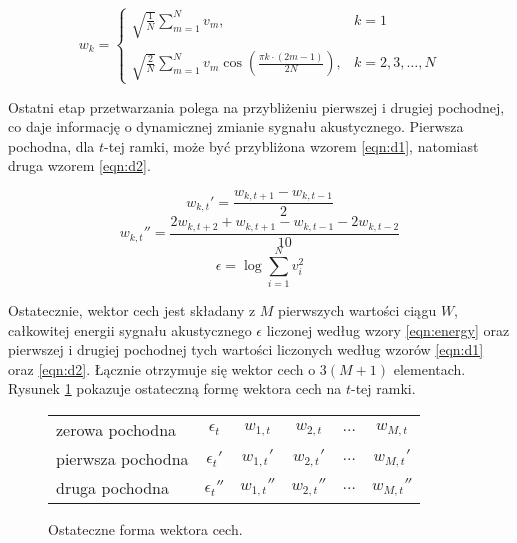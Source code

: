 \documentclass[11pt]{article}
\begin{document}
	 \begin{equation}
		w_k = 
		\begin{cases}
			\sqrt{\frac{1}{N}}\sum_{m=1}^{N}v_m, & k = 1 \\
			&\\
			\sqrt{\frac{2}{N}}\sum_{m=1}^{N}{v_m \cos(\frac{\pi k \cdot (2m - 1)}{2N})}, & k = 2,3,\ldots,N
		\end{cases}
		\label{eqn:DCT}
	 \end{equation}
	 
	 Ostatni etap przetwarzania polega na przybliżeniu pierwszej i drugiej pochodnej, co daje informację o dynamicznej zmianie sygnału akustycznego. Pierwsza pochodna, dla $t$-tej ramki, może być przybliżona wzorem \ref{eqn:d1}, natomiast druga wzorem \ref{eqn:d2}.
	 
	 \begin{equation}
	 	 w_{k,t}'=\frac{w_{k,t+1}-w_{k,t-1}}{2}
	 	 \label{eqn:d1}
	 \end{equation}
	 \begin{equation}
		 w_{k,t}''=\frac{2w_{k,t+2}+w_{k,t+1}-w_{k,t-1}-2w_{k,t-2}}{10}
		 \label{eqn:d2}
	 \end{equation}
	 \begin{equation}
	 	\epsilon = \log \sum_{i=1}^N {v_i^2}
	 	\label{eqn:energy}
	 \end{equation}
	 
	 Ostatecznie, wektor cech jest składany z $M$ pierwszych wartości ciągu $W$, całkowitej energii sygnału akustycznego $\epsilon$ liczonej według wzory \ref{eqn:energy} oraz pierwszej i drugiej pochodnej tych wartości liczonych według wzorów \ref{eqn:d1} oraz \ref{eqn:d2}. Łącznie otrzymuje się wektor cech o $3(M+1)$ elementach. Rysunek \ref{fig:feature_vector} pokazuje ostateczną formę wektora cech na $t$-tej ramki.
	 
	\begin{figure}[H]
		\begin{center}
			\begin{tabular}{l|ccccc}
				zerowa pochodna   & $\epsilon_t$   & $w_{1,t}$   & $w_{2,t}$   & $\ldots$ & $w_{M,t}$   \\
				pierwsza pochodna & $\epsilon_t'$  & $w_{1,t}'$  & $w_{2,t}'$  & $\ldots$ & $w_{M,t}'$  \\
				druga pochodna    & $\epsilon_t''$ & $w_{1,t}''$ & $w_{2,t}''$ & $\ldots$ & $w_{M,t}''$ \\
			\end{tabular}
			\label{fig:feature_vector}
			\caption{Ostateczne forma wektora cech.}
		\end{center}
	\end{figure}
\end{document}
